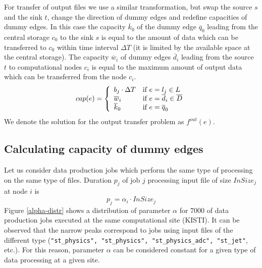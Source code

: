 \documentclass[english]{ddny}
\begin{document}
For transfer of output files we use a similar transformation, but swap the
source $s$ and the sink $t$, change the direction of dummy edges and redefine
capacities of dummy edges. In this case the capacity $\overline{k}_{0}$ of the
dummy edge $\overline{q}_{0}$ leading from the central storage $c_0$ to the
sink $s$ is equal to the amount of data which can be transferred to $c_0$
within time interval $\Delta T$ (it is limited by the available space at the
central storage). The capacity $\overline{w}_{i}$ of dummy edges
$\overline{d}_{i}$ leading from the source $t$ to computational nodes $c_{i}$
is equal to the maximum amount of output data which can be transferred from
the node $c_{i}$.
%
\begin{equation}
\label{edge_cap_out}
cap(e) = \left\{ 
  \begin{array}{l l}
    b_{j} \cdot \Delta T & \text{if }e = l_{j} \in L \\
    \overline{w}_{i} & \text{if } e = \overline{d}_{i} \in \overline{D}\\
    \overline{k}_{0} & \text{if } e = \overline{q}_{0}
  \end{array} \right.
\end{equation}
%
We denote the solution for the output transfer problem as $f^{out}(e)$.

\subsection{Calculating capacity of dummy edges}
\label{dummycap}
Let us consider data production jobs which perform the same type of processing on the same type of files.
Duration $p_{j}$ of job $j$  processing input file of size $InSize_{j}$ at node $i$ is
\begin{equation}
\label{alpha}
p_{j} = \alpha_{i} \cdot InSize_{j} 
\end{equation}
Figure \ref{alpha-distr} shows a distribution of parameter $\alpha$ for 7000 of data production jobs executed at the same computational site (KISTI). It can be observed that the narrow peaks correspond to jobs using input files of the different type (\texttt{"st\_physics", "st\_physics", "st\_physics\_adc", "st\_jet"}, etc.). For this reason, parameter $\alpha$ can be considered constant for a given type of data processing at a given site. 
\end{document}
